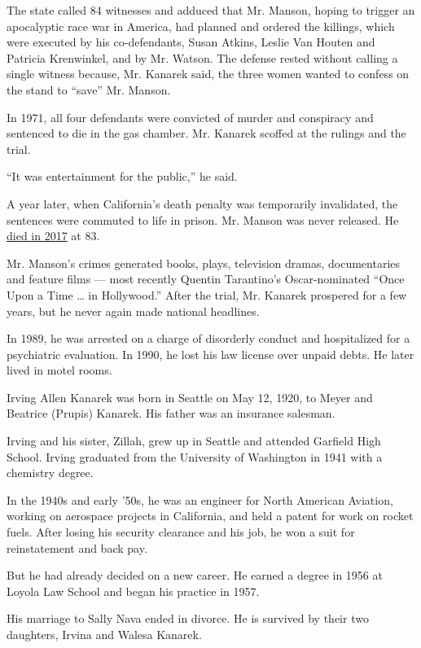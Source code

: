 The state called 84 witnesses and adduced that Mr. Manson, hoping to
trigger an apocalyptic race war in America, had planned and ordered the
killings, which were executed by his co-defendants, Susan Atkins, Leslie
Van Houten and Patricia Krenwinkel, and by Mr. Watson. The defense
rested without calling a single witness because, Mr. Kanarek said, the
three women wanted to confess on the stand to ``save'' Mr. Manson.

In 1971, all four defendants were convicted of murder and conspiracy and
sentenced to die in the gas chamber. Mr. Kanarek scoffed at the rulings
and the trial.

``It was entertainment for the public,'' he said.

A year later, when California's death penalty was temporarily
invalidated, the sentences were commuted to life in prison. Mr. Manson
was never released. He
\href{https://www.nytimes3xbfgragh.onion/2017/11/20/obituaries/charles-manson-dead.html}{died
in 2017} at 83.

Mr. Manson's crimes generated books, plays, television dramas,
documentaries and feature films --- most recently Quentin Tarantino's
Oscar-nominated ``Once Upon a Time \ldots{} in Hollywood.'' After the
trial, Mr. Kanarek prospered for a few years, but he never again made
national headlines.

In 1989, he was arrested on a charge of disorderly conduct and
hospitalized for a psychiatric evaluation. In 1990, he lost his law
license over unpaid debts. He later lived in motel rooms.

Irving Allen Kanarek was born in Seattle on May 12, 1920, to Meyer and
Beatrice (Prupis) Kanarek. His father was an insurance salesman.

Irving and his sister, Zillah, grew up in Seattle and attended Garfield
High School. Irving graduated from the University of Washington in 1941
with a chemistry degree.

In the 1940s and early '50s, he was an engineer for North American
Aviation, working on aerospace projects in California, and held a patent
for work on rocket fuels. After losing his security clearance and his
job, he won a suit for reinstatement and back pay.

But he had already decided on a new career. He earned a degree in 1956
at Loyola Law School and began his practice in 1957.

His marriage to Sally Nava ended in divorce. He is survived by their two
daughters, Irvina and Walesa Kanarek.

